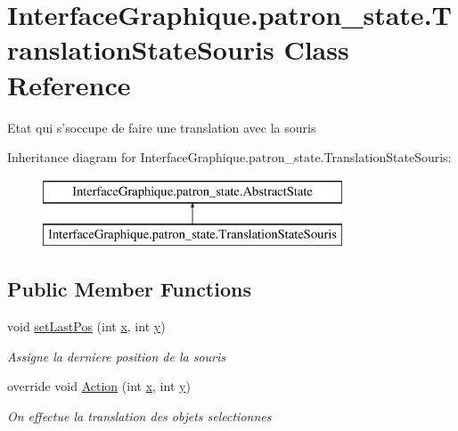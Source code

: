 \hypertarget{class_interface_graphique_1_1patron__state_1_1_translation_state_souris}{\section{Interface\-Graphique.\-patron\-\_\-state.\-Translation\-State\-Souris Class Reference}
\label{class_interface_graphique_1_1patron__state_1_1_translation_state_souris}
}


Etat qui s'soccupe de faire une translation avec la souris  


Inheritance diagram for Interface\-Graphique.\-patron\-\_\-state.\-Translation\-State\-Souris\-:\begin{figure}[H]
\begin{center}
\leavevmode
\includegraphics[height=2.000000cm]{class_interface_graphique_1_1patron__state_1_1_translation_state_souris}
\end{center}
\end{figure}
\subsection*{Public Member Functions}
\begin{DoxyCompactItemize}
\item 
void \hyperlink{class_interface_graphique_1_1patron__state_1_1_translation_state_souris_a509c0b06ffeacd1fee1cace423f55023}{set\-Last\-Pos} (int \hyperlink{group__inf2990_ga6150e0515f7202e2fb518f7206ed97dc}{x}, int \hyperlink{group__inf2990_ga0a2f84ed7838f07779ae24c5a9086d33}{y})
\begin{DoxyCompactList}\small\item\em Assigne la derniere position de la souris \end{DoxyCompactList}\item 
override void \hyperlink{class_interface_graphique_1_1patron__state_1_1_translation_state_souris_a2370ab1d0a55afefdd46eda17dc13ce6}{Action} (int \hyperlink{group__inf2990_ga6150e0515f7202e2fb518f7206ed97dc}{x}, int \hyperlink{group__inf2990_ga0a2f84ed7838f07779ae24c5a9086d33}{y})
\begin{DoxyCompactList}\small\item\em On effectue la translation des objets selectionnes \end{DoxyCompactList}\end{DoxyCompactItemize}


